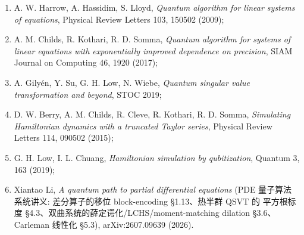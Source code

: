 \documentclass[utf8]{article} %
\numberwithin{equation}{section}   %
\newtheorem{Note}{\hskip 2em {\color{red} 注}}[subsection]
\begin{document}
\begin{Note}[经典文献]
    \begin{enumerate}
        \item A. W. Harrow, A. Hassidim, S. Lloyd, \emph{Quantum algorithm for linear
        systems of equations}, Physical Review Letters 103, 150502 (2009);
        \item A. M. Childs, R. Kothari, R. D. Somma, \emph{Quantum algorithm for systems
        of linear equations with exponentially improved dependence on precision},
        SIAM Journal on Computing 46, 1920 (2017);
        \item A. Gilyén, Y. Su, G. H. Low, N. Wiebe, \emph{Quantum singular value
        transformation and beyond}, STOC 2019;
        \item D. W. Berry, A. M. Childs, R. Cleve, R. Kothari, R. D. Somma,
        \emph{Simulating Hamiltonian dynamics with a truncated Taylor series},
        Physical Review Letters 114, 090502 (2015);
        \item G. H. Low, I. L. Chuang, \emph{Hamiltonian simulation by qubitization},
        Quantum 3, 163 (2019);
        \item Xiantao Li, \emph{A quantum path to partial differential equations}
        (PDE 量子算法系统讲义: 差分算子的移位 block-encoding §1.13、热半群 QSVT 的
        平方根标度 §4.3、双曲系统的薛定谔化/LCHS/moment-matching dilation §3.6、
        Carleman 线性化 §5.3), arXiv:2607.09639 (2026).
    \end{enumerate}
\end{Note}
\end{document}
